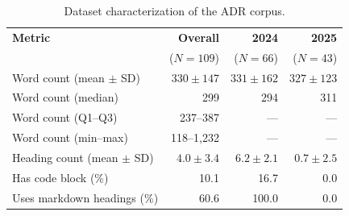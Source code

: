 
\begin{table}[htbp]
\caption{Dataset characterization of the ADR corpus.}
\label{tab:dataset}
\centering
\begin{tabular}{lrrr}
\toprule
\textbf{Metric} & \textbf{Overall} & \textbf{2024} & \textbf{2025} \\
 & ($N{=}109$) & ($N{=}66$) & ($N{=}43$) \\
\midrule
Word count (mean $\pm$ SD) & $330 \pm 147$ & $331 \pm 162$ & $327 \pm 123$ \\
Word count (median) & 299 & 294 & 311 \\
Word count (Q1--Q3) & 237--387 & --- & --- \\
Word count (min--max) & 118--1{,}232 & --- & --- \\
Heading count (mean $\pm$ SD) & $4.0 \pm 3.4$ & $6.2 \pm 2.1$ & $0.7 \pm 2.5$ \\
Has code block (\%) & 10.1 & 16.7 & 0.0 \\
Uses markdown headings (\%) & 60.6 & 100.0 & 0.0 \\
\bottomrule
\end{tabular}
\end{table}


